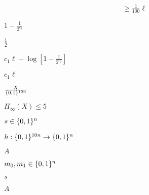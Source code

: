 \documentclass[10pt]{book}
\begin{document}
\begin{mdSnippets}
\begin{mdDisplaySnippet}[9f17e6208479f4395000aa1b3088dff3]
\[\begin{aligned}
&\geq \frac{1}{100}\ell
\end{aligned}
\]%
\end{mdDisplaySnippet}%
\begin{mdInlineSnippet}[b73d4c2b9f6b6c69b4e891832e5e1337]%
$1- \frac{1}{2^{c_2}}$\end{mdInlineSnippet}%
\begin{mdInlineSnippet}[93b05c90d14a117ba52da1d743a43ab1]%
$\frac{1}{2}$\end{mdInlineSnippet}%
\begin{mdInlineSnippet}[c406c0aca174a2a47b7c4b8269641094]%
$c_1\ell - \log[1-\frac{1}{2^{c_2}}]$\end{mdInlineSnippet}%
\begin{mdInlineSnippet}[56280c25a4c2247f78c8b0e2c0566049]%
$c_1\ell$\end{mdInlineSnippet}%
\begin{mdInlineSnippet}%
$X \over \{0,1\}^{10n}$\end{mdInlineSnippet}%
\begin{mdInlineSnippet}%
$H_{\infty}(X)\leq 5$\end{mdInlineSnippet}%
\begin{mdInlineSnippet}[43bee3665f89f73af01ef178208a8224]%
$s\in\{0,1\}^n$\end{mdInlineSnippet}%
\begin{mdInlineSnippet}[f5b9a1e43c795ba8f25b4492787aa34a]%
$h:\{0,1\}^{10n}\rightarrow\{0,1\}^n$\end{mdInlineSnippet}%
\begin{mdInlineSnippet}[7fc56270e7a70fa81a5935b72eacbe29]%
$A$\end{mdInlineSnippet}%
\begin{mdInlineSnippet}%
$m_0,m_1\in\{0,1\}^n$\end{mdInlineSnippet}%
\begin{mdInlineSnippet}[03c7c0ace395d80182db07ae2c30f034]%
$s$\end{mdInlineSnippet}%
\begin{mdInlineSnippet}[7fc56270e7a70fa81a5935b72eacbe29]%
$A$\end{mdInlineSnippet}%

\end{mdSnippets}
\end{document}
